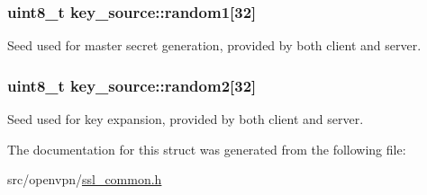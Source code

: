 \subsubsection[{random1}]{\setlength{\rightskip}{0pt plus 5cm}uint8\+\_\+t key\+\_\+source\+::random1\mbox{[}32\mbox{]}}\label{structkey__source_a2c31011a183ba65651390e5bfbda3032}
Seed used for master secret generation, provided by both client and server. \hypertarget{structkey__source_a88a904e92bfac5a03da3f5e0b7f12124}{}
\subsubsection[{random2}]{\setlength{\rightskip}{0pt plus 5cm}uint8\+\_\+t key\+\_\+source\+::random2\mbox{[}32\mbox{]}}\label{structkey__source_a88a904e92bfac5a03da3f5e0b7f12124}
Seed used for key expansion, provided by both client and server. 

The documentation for this struct was generated from the following file\+:\begin{DoxyCompactItemize}
\item 
src/openvpn/\hyperlink{ssl__common_8h}{ssl\+\_\+common.\+h}\end{DoxyCompactItemize}

